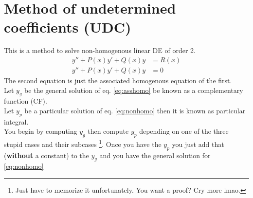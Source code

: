 \documentclass[oneside,11pt,pdftex,final]{book}%
\numberwithin{equation}{section}
\newtheorem{example}[theorem]{Example}
\numberwithin{section}{chapter}
\numberwithin{equation}{chapter}
\begin{document}
%
%
%	
%

\section{Method of undetermined coefficients (UDC)}
This is a method to solve non-homogenous linear DE of order 2.
\begin{align}
	y''+P(x)y'+Q(x)y&=R(x)\label{eq:nonhomo}\\
		y''+P(x)y'+Q(x)y&=0 \label{eq:asshomo}
\end{align}
The second equation is just the associated homogenous equation of the first.\\
Let $ y_g $ be the general solution of eq. \ref{eq:asshomo} be known as a complementary function (CF).\\
Let $ y_p $ be a particular solution of eq. \ref{eq:nonhomo} then it is known as particular integral.
\\
You begin by computing $ y_g $ then compute $ y_p $ depending on one of the three stupid cases and their subcases \footnote{Just have to memorize it unfortunately. You want a proof? Cry more lmao.}. Once you have the $ y_p $ you just add that (\textbf{without} a constant) to the $ y_g $ and you have the general solution for \ref{eq:nonhomo}
\end{document}

